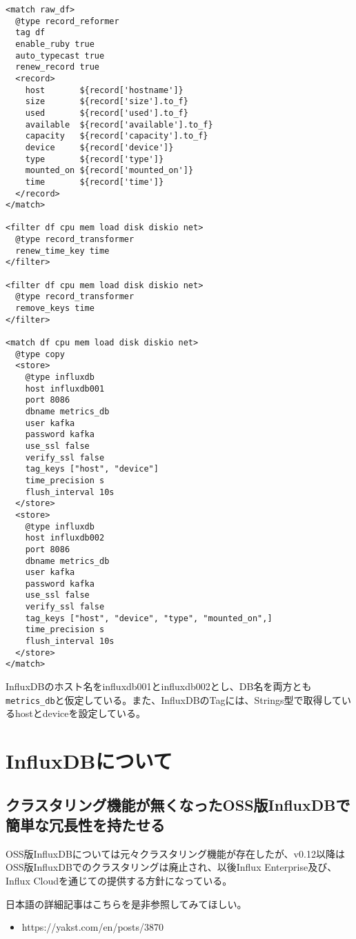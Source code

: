 \begin{lstlisting}
<match raw_df>
  @type record_reformer
  tag df
  enable_ruby true
  auto_typecast true
  renew_record true
  <record>
    host       ${record['hostname']}
    size       ${record['size'].to_f}
    used       ${record['used'].to_f}
    available  ${record['available'].to_f}
    capacity   ${record['capacity'].to_f}
    device     ${record['device']}
    type       ${record['type']}
    mounted_on ${record['mounted_on']}
    time       ${record['time']}
  </record>
</match>

<filter df cpu mem load disk diskio net>
  @type record_transformer
  renew_time_key time
</filter>

<filter df cpu mem load disk diskio net>
  @type record_transformer
  remove_keys time
</filter>

<match df cpu mem load disk diskio net>
  @type copy
  <store>
    @type influxdb
    host influxdb001
    port 8086
    dbname metrics_db
    user kafka
    password kafka
    use_ssl false
    verify_ssl false
    tag_keys ["host", "device"]
    time_precision s
    flush_interval 10s
  </store>
  <store>
    @type influxdb
    host influxdb002
    port 8086
    dbname metrics_db
    user kafka
    password kafka
    use_ssl false
    verify_ssl false
    tag_keys ["host", "device", "type", "mounted_on",]
    time_precision s
    flush_interval 10s
  </store>
</match>
\end{lstlisting}

InfluxDBのホスト名をinfluxdb001とinfluxdb002とし、DB名を両方とも\verb|metrics_db|と仮定している。また、InfluxDBのTagには、Strings型で取得しているhostとdeviceを設定している。


\section{InfluxDBについて}
\subsection{クラスタリング機能が無くなったOSS版InfluxDBで簡単な冗長性を持たせる}
OSS版InfluxDBについては元々クラスタリング機能が存在したが、v0.12以降はOSS版InfluxDBでのクラスタリングは廃止され、以後Influx Enterprise及び、Influx Cloudを通じての提供する方針になっている。

日本語の詳細記事はこちらを是非参照してみてほしい。

\begin{itemize}
	\item https://yakst.com/en/posts/3870
\end{itemize}

